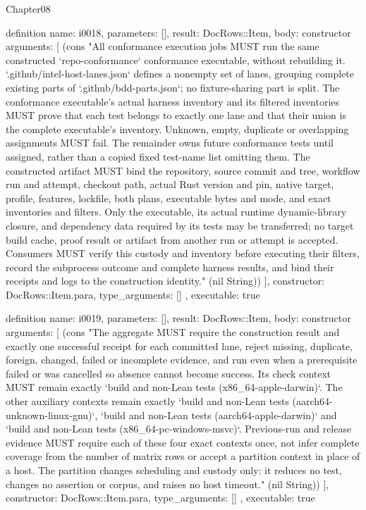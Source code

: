 \begin{lexlean}{Chapter08}
\begin{semanticmodule}
definition{
  name: i0018,
  parameters: [],
  result: DocRows::Item,
  body: constructor{
    arguments: [
      (cons "All conformance execution jobs MUST run the same constructed `repo-conformance` conformance executable, without rebuilding it. `.github/intel-host-lanes.json` defines a nonempty set of lanes, grouping complete existing parts of `.github/bdd-parts.json`; no fixture-sharing part is split. The conformance executable's actual harness inventory and its filtered inventories MUST prove that each test belongs to exactly one lane and that their union is the complete executable's inventory. Unknown, empty, duplicate or overlapping assignments MUST fail. The remainder owns future conformance tests until assigned, rather than a copied fixed test-name list omitting them. The constructed artifact MUST bind the repository, source commit and tree, workflow run and attempt, checkout path, actual Rust version and pin, native target, profile, features, lockfile, both plans, executable bytes and mode, and exact inventories and filters. Only the executable, its actual runtime dynamic-library closure, and dependency data required by its tests may be transferred; no target build cache, proof result or artifact from another run or attempt is accepted. Consumers MUST verify this custody and inventory before executing their filters, record the subprocess outcome and complete harness results, and bind their receipts and logs to the construction identity." (nil String))
    ],
    constructor: DocRows::Item.para,
    type_arguments: []
  },
  executable: true
}

definition{
  name: i0019,
  parameters: [],
  result: DocRows::Item,
  body: constructor{
    arguments: [
      (cons "The aggregate MUST require the construction result and exactly one successful receipt for each committed lane, reject missing, duplicate, foreign, changed, failed or incomplete evidence, and run even when a prerequisite failed or was cancelled so absence cannot become success. Its check context MUST remain exactly `build and non-Lean tests (x86_64-apple-darwin)`. The other auxiliary contexts remain exactly `build and non-Lean tests (aarch64-unknown-linux-gnu)`, `build and non-Lean tests (aarch64-apple-darwin)` and `build and non-Lean tests (x86_64-pc-windows-msvc)`. Previous-run and release evidence MUST require each of these four exact contexts once, not infer complete coverage from the number of matrix rows or accept a partition context in place of a host. The partition changes scheduling and custody only: it reduces no test, changes no assertion or corpus, and raises no host timeout." (nil String))
    ],
    constructor: DocRows::Item.para,
    type_arguments: []
  },
  executable: true
}


\end{semanticmodule}
\end{lexlean}
